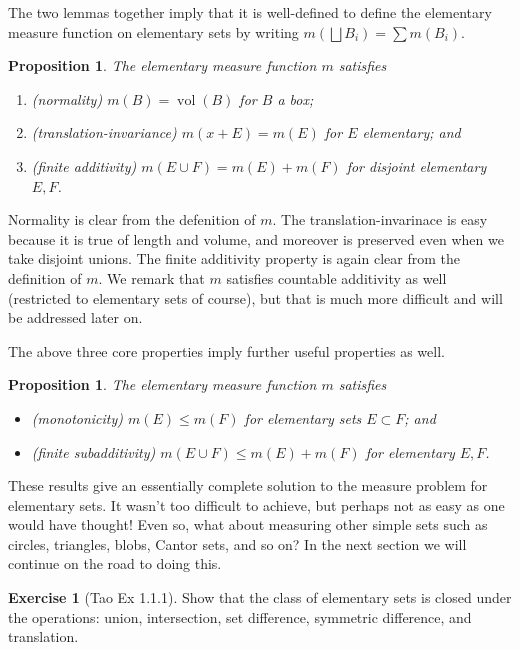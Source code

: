 \documentclass[11pt,oneside]{amsbook}
\DeclareMathOperator{\vol}{vol}
\theoremstyle{definition}
\newtheorem{exerc}{Exercise}[section]
\theoremstyle{plain}
\newtheorem{prop}[thm]{Proposition}
\theoremstyle{definition}
\theoremstyle{remark}
\numberwithin{equation}{section}
\numberwithin{figure}{section}
\begin{document}
The two lemmas together imply that it is well-defined to define the elementary measure function on elementary sets by writing $m(\bigsqcup B_i)=\sum m(B_i)$.

\begin{prop}
  The elementary measure function $m$ satisfies
  \begin{enumerate}
  \item (normality) $m(B)=\vol(B)$ for $B$ a box;
  \item (translation-invariance) $m(x+E)=m(E)$ for $E$ elementary; and
  \item (finite additivity) $m(E\cup F)=m(E)+m(F)$ for disjoint elementary $E,F$.
  \end{enumerate}
\end{prop}

Normality is clear from the defenition of $m$. The translation-invarinace is easy because it is true of length and volume, and moreover is preserved even when we take disjoint unions. The finite additivity property is again clear from the definition of $m$. We remark that $m$ satisfies countable additivity as well (restricted to elementary sets of course), but that is much more difficult and will be addressed later on.

The above three core properties imply further useful properties as well.

\begin{prop}
  The elementary measure function $m$ satisfies
  \begin{itemize}
  \item (monotonicity) $m(E)\leq m(F)$ for elementary sets $E\subset F$; and
  \item (finite subadditivity) $m(E\cup F)\leq m(E)+m(F)$ for elementary $E,F$.
  \end{itemize}
\end{prop}

These results give an essentially complete solution to the measure problem for elementary sets. It wasn't too difficult to achieve, but perhaps not as easy as one would have thought! Even so, what about measuring other simple sets such as circles, triangles, blobs, Cantor sets, and so on? In the next section we will continue on the road to doing this.

\begin{exerc}[Tao Ex 1.1.1]
  Show that the class of elementary sets is closed under the operations: union, intersection, set difference, symmetric difference, and translation.
\end{exerc}
\end{document}

